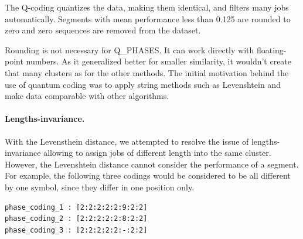 \documentclass{jhps}
\begin{document}
The Q-coding quantizes the data, making them identical, and filters many jobs automatically.
Segments with mean performance less than 0.125 are rounded to zero and zero sequences are removed from the dataset.

Rounding is not necessary for Q\_PHASES.
It can work directly with floating-point numbers.
As it generalized better for smaller similarity, it wouldn't create that many clusters as for the other methods.
The initial motivation behind the use of quantum coding was to apply string methods such as Levenshtein and make data comparable with other algorithms.



\medskip

\paragraph{Lengths-invariance.}
With the Levensthein distance, we attempted to resolve the issue of lengths-invariance allowing to assign jobs of different length into the same cluster.
However, the Levenshtein distance cannot consider the performance of a segment.
For example, the following three codings would be considered to be all different by one symbol, since they differ in one position only.

\begin{lstlisting}
phase_coding_1 : [2:2:2:2:2:9:2:2]
phase_coding_2 : [2:2:2:2:2:8:2:2]
phase_coding_3 : [2:2:2:2:2:-:2:2]
\end{lstlisting}
\end{document}
